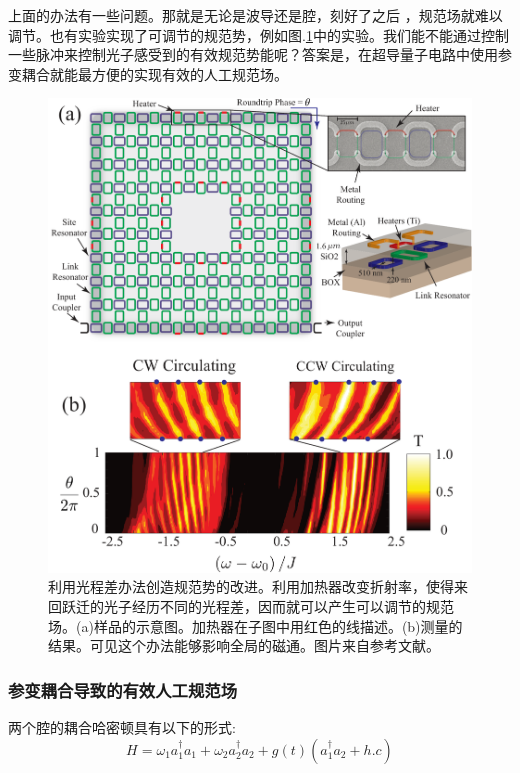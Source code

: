 \documentclass[supercite]{HustGraduPaper}
\begin{document}
上面的办法有一些问题。那就是无论是波导还是腔，刻好了之后 ，规范场就难以调节。也有实验实现了可调节的规范势，例如图.\ref{fig:mhinvariants}中的实验。我们能不能通过控制一些脉冲来控制光子感受到的有效规范势能呢？答案是，在超导量子电路中使用参变耦合\cite{Koch2010}就能最方便的实现有效的人工规范场。
\begin{figure}
	\centering
	\includegraphics[width=0.9\linewidth]{Figures/topphoto/MH_invariants}
	\caption{利用光程差办法创造规范势的改进。利用加热器改变折射率，使得来回跃迁的光子经历不同的光程差，因而就可以产生可以调节的规范场。(a)样品的示意图。加热器在子图中用红色的线描述。(b)测量的结果。可见这个办法能够影响全局的磁通。图片来自参考文献\cite{mittal2016measurement}。}
	\label{fig:mhinvariants}
\end{figure}



   
   \subsubsection{参变耦合导致的有效人工规范场}
   两个腔的耦合哈密顿具有以下的形式\cite{Roushan2017a}:
   \begin{equation}
   H = \omega_1 a^\dagger_1 a_1 + \omega_2 a^\dagger_2 a_2 + g(t) (a^\dagger_1 a_2 + h.c)
   \end{equation}
   
\end{document}
